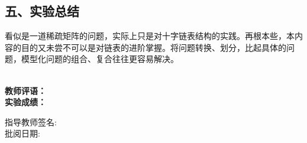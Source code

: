\documentclass[UTF8, a4paper]{ctexart}
\begin{document}
\subsection*{五、实验总结}
看似是一道稀疏矩阵的问题，实际上只是对十字链表结构的实践。再根本些，本内容的目的又未尝不可以是对链表的进阶掌握。将问题转换、划分，比起具体的问题，模型化问题的组合、复合往往更容易解决。

~\\
\textbf{教师评语：}
~\\
\textbf{实验成绩：}

\begin{flushright}
\mbox{指导教师签名:\qquad\qquad} \\
\mbox{批阅日期:\qquad\qquad}
\end{flushright}
\end{document}
